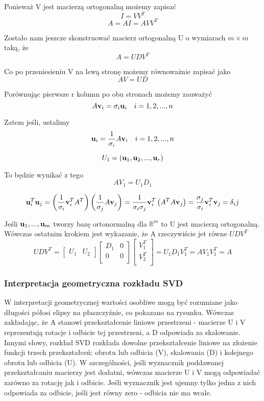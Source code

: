 \documentclass{article}
\begin{document}
Ponieważ V jest macierzą ortogonalną możemy zapisać
\[I = VV^T \]
\[A = AI = AVV^T \]

Zostało nam jeszcze skonstruować macierz ortogonalną U o wymiarach $m \times m$ taką, że
\[A = UDV^T \]

Co po przeniesieniu V na lewą stronę możemy równoważnie zapisać jako
\[AV = UD \]

Porównując pierwsze r kolumn po obu stronach możemy zauważyć
\[A \vb{v}_i = \sigma_i \vb{u}_i \quad i = 1, 2,..., n \]

Zatem jeśli, ustalimy 
\[\vb{u}_i = \frac{1}{\sigma_i}A \vb{v}_i \quad i = 1, 2,..., n \]

\[U_1 = (\vb{u}_1, \vb{u}_2,..., \vb{u}_r) \]

To będzie wynikać z tego
\[AV_1 = U_1 D_1 \]

\[\vb{u}_i^T \vb{u}_j = \left(\frac{1}{\sigma_i}\vb{v}_i^T A^T \right) \left(\frac{1}{\sigma_j}A \vb{v}_j \right)
= \frac{1}{\sigma_i \sigma_j}\vb{v}_i^T \left( A^T A \vb{v}_j \right)
= \frac{\sigma_j}{\sigma_i} \vb{v}_i^T \vb{v}_j 
= \delta_ij \]

Jeśli $\vb{u}_1,..., \vb{u}_m$ tworzy bazę ortonormalną dla $\mathbb{R}^m$ to U jest macierzą ortogonalną. Wówczas ostatnim krokiem jest wykazanie, że A rzeczywiście jet równe $UDV^T$
\[UDV^T = \begin{bmatrix}
U_1 & U_2
\end{bmatrix}
\begin{bmatrix}
D_1 & 0 \\
0 & 0 \\
\end{bmatrix}
\begin{bmatrix}
V_1^T \\
V_2^T \\
\end{bmatrix}
= U_1 D_1 V_1^T = AV_1 V_1^T = A \]

\subsubsection*{\Large{Interpretacja geometryczna rozkładu SVD}}
W interpretacji geometrycznej wartości osobliwe mogą być rozumiane jako długości półosi elipsy na płaszczyźnie, co pokazano na rysunku. Wówczas zakładając, że A stanowi przekształcenie liniowe przestrzeni - macierze U i V reprezentują rotacje i odbicie tej przestrzeni, a D odpowiada za skalowanie. Innymi słowy, rozkład SVD rozkłada dowolne przekształcenie liniowe na złożenie funkcji trzech przekształceń: obrotu lub odbicia (V), skalowania (D) i kolejnego obrotu lub odbicia (U). W szczególności, jeśli wyznacznik poddawanej przekształcaniu macierzy jest dodatni, wówczas macierze U i V mogą odpowiadać zarówno za rotację jak i odbicie. Jeśli wyznacznik jest ujemny tylko jedna z nich odpowiada za odbicie, jeśli jest równy zero - odbicia nie ma wcale.
\end{document}
